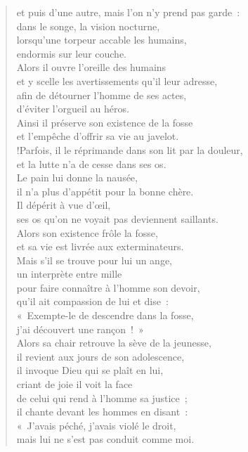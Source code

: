 \documentclass[french,twoside]{book} %
\begin{document}
\begin{verse}
et puis d’une autre, mais l’on n’y prend pas garde :\\
dans le songe, la vision nocturne, \\
lorsqu’une torpeur accable les humains, \\
endormis sur leur couche.\\
Alors il ouvre l’oreille des humains \\
et y scelle les avertissements qu’il leur adresse,\\
afin de détourner l’homme de ses actes, \\
d’éviter l’orgueil au héros.\\
Ainsi il préserve son existence de la fosse \\
et l’empêche d’offrir sa vie au javelot.\\!Parfois, il le réprimande dans son lit par la douleur, \\
et la lutte n’a de cesse dans ses os.\\
Le pain lui donne la nausée, \\
il n’a plus d’appétit pour la bonne chère.\\
Il dépérit à vue d’œil, \\
ses os qu’on ne voyait pas deviennent saillants.\\
Alors son existence frôle la fosse, \\
et sa vie est livrée aux exterminateurs.\\
Mais s’il se trouve pour lui un ange, \\
un interprète entre mille \\
pour faire connaître à l’homme son devoir,\\
qu’il ait compassion de lui et dise : \\
« Exempte-le de descendre dans la fosse, \\
j’ai découvert une rançon ! »\\
Alors sa chair retrouve la sève de la jeunesse, \\
il revient aux jours de son adolescence,\\
il invoque Dieu qui se plaît en lui, \\
criant de joie il voit la face \\
de celui qui rend à l’homme sa justice ;\\
il chante devant les hommes en disant : \\
« J’avais péché, j’avais violé le droit, \\
mais lui ne s’est pas conduit comme moi.\\

\end{verse}
\end{document}
